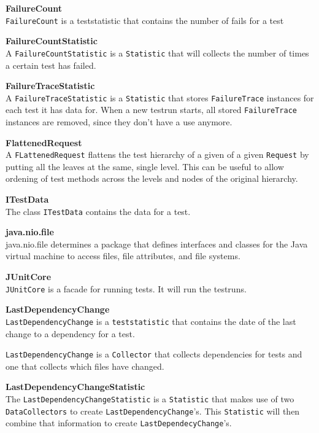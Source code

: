 \documentclass[i2]{oss}
\newcommand{\class}[1]{\texttt{#1}}
\newcommand{\gloss}[1]{\textbf{#1}}
\begin{document}
\begin{description}
\item \gloss{FailureCount} \\ 
\class{FailureCount} is a teststatistic that contains the number of fails for a test

\item \gloss{FailureCountStatistic}\\
A \class{FailureCountStatistic} is a \class{Statistic} that will collects the number of times a certain test has failed.

\item \gloss{FailureTraceStatistic}\\
A \class{FailureTraceStatistic} is a \class{Statistic} that stores \class{FailureTrace} instances for each test it has data for. When a new testrun starts, all stored \class{FailureTrace} instances are removed, since they don't have a use anymore.
	

\item \gloss{FlattenedRequest}\\
A \class{FLattenedRequest} flattens the test hierarchy of a given of a given \class{Request} by putting all the leaves at the same, single level. This can be useful to allow ordening of test methods across the levels and nodes of the original hierarchy.

\item \gloss{ITestData} \\
The class \class{ITestData} contains the data for a test.

\item \gloss{java.nio.file} \\
java.nio.file determines a package that defines interfaces and classes for the Java virtual machine to access files, file attributes, and file systems.

\item \gloss{JUnitCore} \\
\class{JUnitCore} is a facade for running tests. It will run the testruns.

\item \gloss{LastDependencyChange} \\
\class{LastDependencyChange} is a \class{teststatistic} that contains the date of the last change to a dependency for a test.

\class{LastDependencyChange} is a \class{Collector} that collects dependencies for tests and one that collects which files have changed.

\item \gloss{LastDependencyChangeStatistic} \\
The \class{LastDependencyChangeStatistic} is a \class{Statistic} that makes use of two \class{DataCollectors} to create \class{LastDependencyChange}'s. This \class{Statistic} will then combine that information to create \class{LastDependecyChange}'s.


\end{description}
\end{document}
